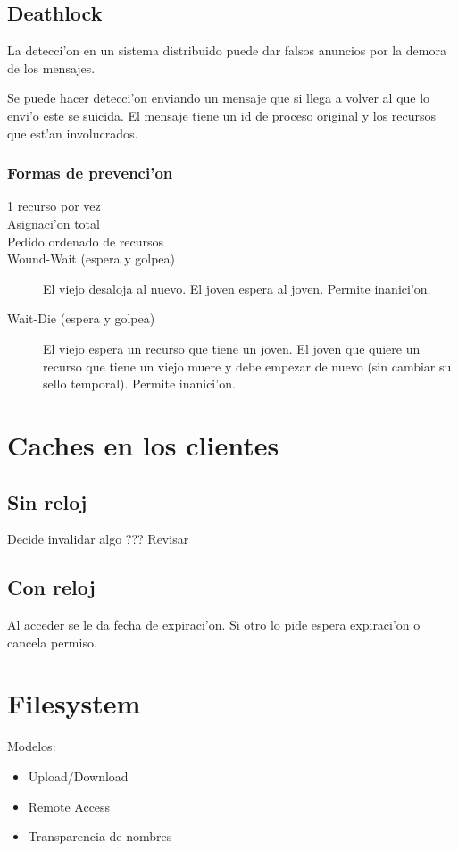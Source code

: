 \documentclass[a4paper,spanish]{article}
\begin{document}
\subsection{Deathlock}
La detecci'on en un sistema distribuido puede dar falsos anuncios por la demora
de los mensajes.

Se puede hacer detecci'on enviando un mensaje que si llega a volver al que lo
envi'o este se suicida. El mensaje tiene un id de proceso original y los
recursos que est'an involucrados.

\subsubsection{Formas de prevenci'on}
\begin{description}
	\item[1 recurso por vez]
	\item[Asignaci'on total]
	\item[Pedido ordenado de recursos]
	\item[Wound-Wait (espera y golpea)] El viejo desaloja al nuevo. El
joven espera al joven. Permite inanici'on.
	\item[Wait-Die (espera y golpea)] El viejo espera un recurso que tiene
un joven. El joven que quiere un recurso que tiene un viejo muere y debe
empezar de nuevo (sin cambiar su sello temporal). Permite inanici'on.
\end{description}

\section{Caches en los clientes}
\subsection{Sin reloj}
Decide invalidar algo ??? Revisar

\subsection{Con reloj}
Al acceder se le da fecha de expiraci'on. Si otro lo pide espera expiraci'on o
cancela permiso.
	
\section{Filesystem}
Modelos:
\begin{itemize}
	\item Upload/Download
	\item Remote Access
	\item Transparencia de nombres
\end{itemize}
\end{document}
